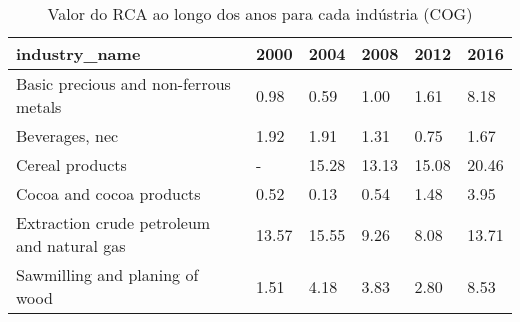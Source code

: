 \begin{table}
\centering
\caption{Valor do RCA ao longo dos anos para cada indústria (COG)}
\begin{tabular}{p{6cm}p{1.5cm}p{1.5cm}p{1.5cm}p{1.5cm}p{1.5cm}}
\toprule
                             industry\_name &  2000 &  2004 &  2008 &  2012 &  2016 \\
\midrule
     Basic precious and non-ferrous metals &  0.98 &  0.59 &  1.00 &  1.61 &  8.18 \\
                            Beverages, nec &  1.92 &  1.91 &  1.31 &  0.75 &  1.67 \\
                           Cereal products &     - & 15.28 & 13.13 & 15.08 & 20.46 \\
                  Cocoa and cocoa products &  0.52 &  0.13 &  0.54 &  1.48 &  3.95 \\
Extraction crude petroleum and natural gas & 13.57 & 15.55 &  9.26 &  8.08 & 13.71 \\
            Sawmilling and planing of wood &  1.51 &  4.18 &  3.83 &  2.80 &  8.53 \\
\bottomrule
\end{tabular}
\end{table}
